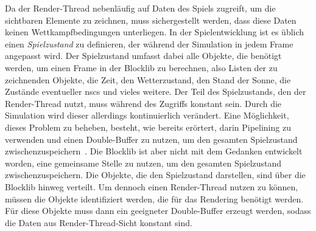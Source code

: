 Da der Render-Thread nebenläufig auf Daten des Spiels zugreift, um die sichtbaren Elemente zu zeichnen, muss sichergestellt werden, dass diese Daten keinen Wettkampfbedingungen unterliegen. In der Spielentwicklung ist es üblich einen \emph{Spielzustand} zu definieren, der während der Simulation in jedem Frame angepasst wird. Der Spielzustand umfasst dabei alle Objekte, die benötigt werden, um einen Frame in der Blocklib zu berechnen, also Listen der zu zeichnenden Objekte, die Zeit, den Wetterzustand, den Stand der Sonne, die Zustände eventueller \acp{nsc} und vieles weitere. Der Teil des Spielzustands, den der Render-Thread nutzt, muss während des Zugriffs konstant sein. Durch die Simulation wird dieser allerdings kontinuierlich verändert. Eine Möglichkeit, dieses Problem zu beheben, besteht, wie bereits erörtert, darin Pipelining zu verwenden und einen Double-Buffer zu nutzen, um den gesamten Spielzustand zwischenzuspeichern~\cite{Tatarchuk2014}. Die Blocklib ist aber nicht mit dem Gedanken entwickelt worden, eine gemeinsame Stelle zu nutzen, um den gesamten Spielzustand zwischenzuspeichern. Die Objekte, die den Spielzustand darstellen, sind über die Blocklib hinweg verteilt. Um dennoch einen Render-Thread nutzen zu können, müssen die Objekte identifiziert werden, die für das Rendering benötigt werden. Für diese Objekte muss dann ein geeigneter Double-Buffer erzeugt werden, sodass die Daten aus Render-Thread-Sicht konstant sind.

